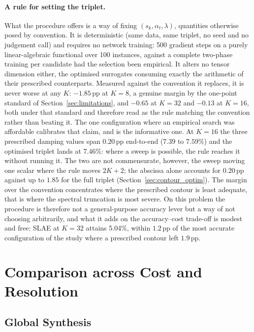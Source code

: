 ﻿\documentclass[a4paper,12pt]{article}
\theoremstyle{definition}
\theoremstyle{remark}
\begin{document}
\paragraph{A rule for setting the triplet.}
What the procedure offers is a way of fixing $(s_k, \alpha_t, \lambda)$, quantities otherwise posed by convention. It is deterministic (same data, same triplet, no seed and no judgement call) and requires no network training: 500 gradient steps on a purely linear-algebraic functional over 100 instances, against a complete two-phase training per candidate had the selection been empirical. It alters no tensor dimension either, the optimised surrogates consuming exactly the arithmetic of their prescribed counterparts. Measured against the convention it replaces, it is never worse at any $K$: $-1.85$\,pp at $K=8$, a genuine margin by the one-point standard of Section~\ref{sec:limitations}, and $-0.65$ at $K=32$ and $-0.13$ at $K=16$, both under that standard and therefore read as the rule matching the convention rather than beating it. The one configuration where an empirical search was affordable calibrates that claim, and is the informative one. At $K=16$ the three prescribed damping values span $0.20$\,pp end-to-end ($7.39$ to $7.59$\%) and the optimised triplet lands at $7.46$\%: where a sweep is possible, the rule reaches it without running it. The two are not commensurate, however, the sweep moving one scalar where the rule moves $2K+2$; the abscissa alone accounts for $0.20$\,pp against up to $1.85$ for the full triplet (Section~\ref{sec:contour_optim}). The margin over the convention concentrates where the prescribed contour is least adequate, that is where the spectral truncation is most severe. On this problem the procedure is therefore not a general-purpose accuracy lever but a way of not choosing arbitrarily, and what it adds on the accuracy--cost trade-off is modest and free: SLAE at $K=32$ attains 5.04\%, within $1.2$\,pp of the most accurate configuration of the study where a prescribed contour left $1.9$\,pp.

\section{Comparison across Cost and Resolution}
\label{sec:comparison}

\subsection{Global Synthesis}
\label{sec:synthesis}
\end{document}
